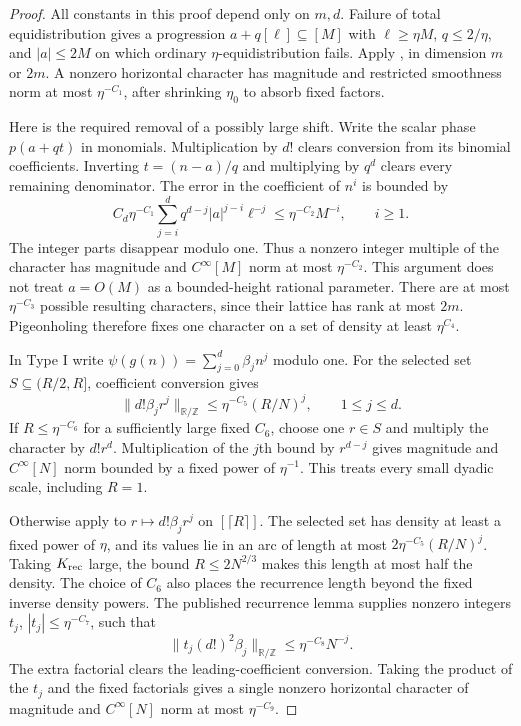 \begin{proof}
All constants in this proof depend only on $m,d$.  Failure of total
equidistribution gives a progression $a+q[\ell]\subseteq[M]$ with
$\ell\geq\eta M$, $q\leq2/\eta$, and $|a|\leq2M$ on which ordinary
$\eta$-equidistribution fails.  Apply
\cite[Theorem~2.9]{GTOrbits2012}, in dimension $m$ or $2m$.  A nonzero
horizontal character has magnitude and restricted smoothness norm at
most $\eta^{-C_1}$, after shrinking $\eta_0$ to absorb fixed factors.

Here is the required removal of a possibly large shift.  Write the scalar
phase $p(a+qt)$ in monomials.  Multiplication by $d!$ clears conversion
from its binomial coefficients.  Inverting $t=(n-a)/q$ and multiplying
by $q^d$ clears every remaining denominator.  The error in the coefficient
of $n^i$ is bounded by
\begin{equation}\label{gi-shift-removal}
 C_d\eta^{-C_1}\sum_{j=i}^d q^{d-j}|a|^{j-i}\ell^{-j}
       \leq\eta^{-C_2}M^{-i},\qquad i\geq1.
\end{equation}
The integer parts disappear modulo one.  Thus a nonzero integer multiple
of the character has magnitude and $C^\infty[M]$ norm at most
$\eta^{-C_2}$.  This argument does not treat $a=O(M)$ as a bounded-height
rational parameter.  There are at most $\eta^{-C_3}$ possible resulting
characters, since their lattice has rank at most $2m$.  Pigeonholing
therefore fixes one character on a set of density at least $\eta^{C_4}$.

In Type I write
$\psi(g(n))=\sum_{j=0}^d\beta_jn^j$ modulo one.  For the selected set
$S\subseteq(R/2,R]$, coefficient conversion gives
\begin{equation}\label{gi-one-coefficients}
 \|d!\beta_jr^j\|_{\mathbb R/\mathbb Z}
       \leq\eta^{-C_5}(R/N)^j,\qquad 1\leq j\leq d.
\end{equation}
If $R\leq\eta^{-C_6}$ for a sufficiently large fixed $C_6$, choose one
$r\in S$ and multiply the character by $d!r^d$.  Multiplication of the
$j$th bound by $r^{d-j}$ gives magnitude and $C^\infty[N]$ norm bounded
by a fixed power of $\eta^{-1}$.  This treats every small dyadic scale,
including $R=1$.

Otherwise apply \cite[Lemma~4.5]{GTOrbits2012} to
$r\mapsto d!\beta_jr^j$ on $[\lceil R\rceil]$.  The selected set has
density at least a fixed power of $\eta$, and its values lie in an arc
of length at most $2\eta^{-C_5}(R/N)^j$.  Taking $K_{\rm rec}$ large,
the bound $R\leq2N^{2/3}$ makes this length at most half the density.
The choice of $C_6$ also places the recurrence length beyond the fixed
inverse density powers.  The published recurrence lemma supplies
nonzero integers $t_j$, $|t_j|\leq\eta^{-C_7}$, such that
\begin{equation}\label{gi-recurrent-coefficients}
 \|t_j(d!)^2\beta_j\|_{\mathbb R/\mathbb Z}
                    \leq\eta^{-C_8}N^{-j}.
\end{equation}
The extra factorial clears the leading-coefficient conversion.  Taking
the product of the $t_j$ and the fixed factorials gives a single nonzero
horizontal character of magnitude and $C^\infty[N]$ norm at most
$\eta^{-C_9}$.


\end{proof}

